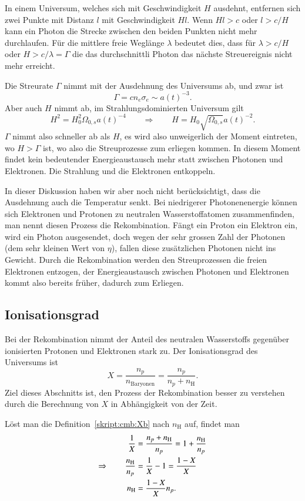 In einem Universum, welches sich mit Geschwindigkeit $H$ ausdehnt,
entfernen sich zwei Punkte mit Distanz $l$ mit Geschwindigkeit $Hl$.
Wenn $Hl>c$ oder $l>c/H$ kann ein Photon die Strecke zwischen den
beiden Punkten nicht mehr durchlaufen.
Für die mittlere freie Weglänge $\lambda$ bedeutet dies, dass
für $\lambda > c/H$ oder $H>c/\lambda=\Gamma$ die das durchschnittli
Photon das nächste Streuereignis nicht mehr erreicht.

Die Streurate $\Gamma$ nimmt mit der Ausdehnung des Universums ab,
und zwar ist
\[
\Gamma
=
cn_e\sigma_e
\sim
a(t)^{-3}.
\]
Aber auch $H$ nimmt ab,
im Strahlungsdominierten Universum gilt
\[
H^2 = H_0^2  \Omega_{0,s} a(t)^{-4}
\qquad\Rightarrow\qquad
H=H_0\sqrt{\Omega_{0,s}} a(t)^{-2}.
\]
$\Gamma$ nimmt also schneller ab als $H$, es wird also unweigerlich
der Moment eintreten, wo $H>\Gamma$ ist, wo also die Streuprozesse
zum erliegen kommen.
In diesem Moment findet kein bedeutender Energieaustausch mehr statt
zwischen Photonen und Elektronen.
Die Strahlung und die Elektronen entkoppeln.

In dieser Diskussion haben wir aber noch nicht berücksichtigt, dass
die Ausdehnung auch die Temperatur senkt.
Bei niedrigerer Photonenenergie können sich Elektronen und Protonen
zu neutralen Wasserstoffatomen zusammenfinden, man nennt diesen
Prozess die Rekombination.
Fängt ein Proton ein Elektron ein, wird ein Photon ausgesendet,
doch wegen der sehr grossen Zahl der Photonen (dem sehr kleinen Wert
von $\eta$), fallen diese zusätzlichen Photonen nicht ins Gewicht.
Durch die Rekombination werden den Streuprozessen die freien Elektronen
entzogen, der Energieaustausch zwischen Photonen und Elektronen
kommt also bereits früher, dadurch zum Erliegen.

\subsection{Ionisationsgrad}
Bei der Rekombination nimmt der Anteil des neutralen Wasserstoffs
gegenüber ionisierten Protonen und Elektronen stark zu.
Der Ionisationsgrad des Universums ist 
\begin{equation}
X=\frac{n_p}{n_\text{Baryonen}}=\frac{n_p}{n_p+n_\text{H}}.
\label{skript:cmb:Xb}
\end{equation}
Ziel dieses Abschnitts ist, den Prozess der Rekombination besser zu
verstehen durch die Berechnung von $X$ in Abhängigkeit 
von der Zeit.

Löst man die Definition~\eqref{skript:cmb:Xb} nach $n_\text{H}$ auf,
findet man
\begin{align}
\frac1X
&=
\frac{n_p+n_\text{H}}{n_p}
=
1+
\frac{n_\text{H}}{n_p}
\notag
\\
\Rightarrow
\qquad
\frac{n_\text{H}}{n_p}
&=
\frac{1}{X}-1
=
\frac{1-X}{X}
\notag
\\
n_\text{H}
&=
\frac{1-X}{X}n_p.
\label{skript:cmb:XnH}
\end{align}

